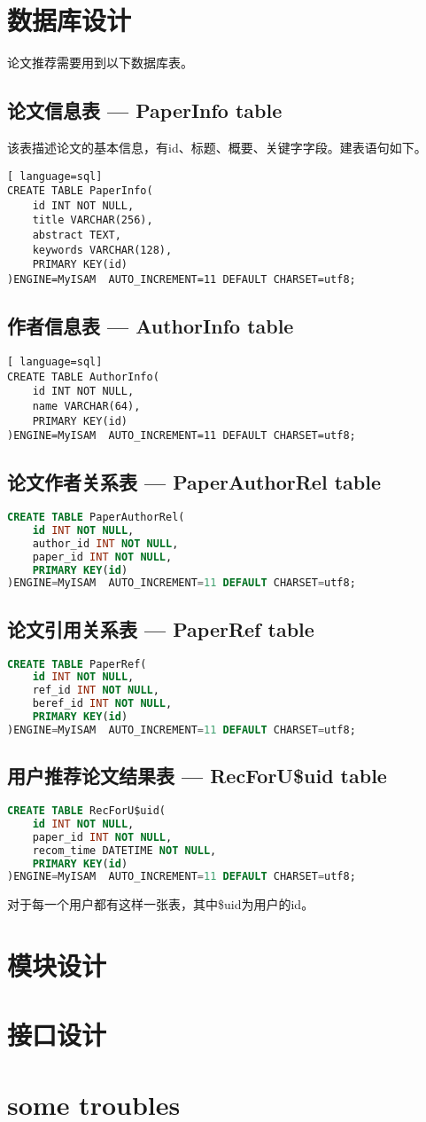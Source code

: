 \documentclass[a4paper]{article}
\begin{document}
\section{数据库设计}
论文推荐需要用到以下数据库表。
\subsection{论文信息表 --- PaperInfo table}
该表描述论文的基本信息，有id、标题、概要、关键字字段。建表语句如下。
\begin{lstlisting}[ language=sql]
CREATE TABLE PaperInfo(
    id INT NOT NULL,
    title VARCHAR(256),
    abstract TEXT,
    keywords VARCHAR(128),
    PRIMARY KEY(id)
)ENGINE=MyISAM  AUTO_INCREMENT=11 DEFAULT CHARSET=utf8;
\end{lstlisting}
\subsection{作者信息表 --- AuthorInfo table}
\begin{lstlisting}[ language=sql]
CREATE TABLE AuthorInfo(
    id INT NOT NULL,
    name VARCHAR(64),
    PRIMARY KEY(id)
)ENGINE=MyISAM  AUTO_INCREMENT=11 DEFAULT CHARSET=utf8;
\end{lstlisting}
\subsection{论文作者关系表 --- PaperAuthorRel table}
\begin{lstlisting}[language=sql]
CREATE TABLE PaperAuthorRel(
    id INT NOT NULL,
    author_id INT NOT NULL,
    paper_id INT NOT NULL,
    PRIMARY KEY(id)
)ENGINE=MyISAM  AUTO_INCREMENT=11 DEFAULT CHARSET=utf8;
\end{lstlisting}
\subsection{论文引用关系表 --- PaperRef table}
\begin{lstlisting}[language=sql]
CREATE TABLE PaperRef(
    id INT NOT NULL,
    ref_id INT NOT NULL,
    beref_id INT NOT NULL,
    PRIMARY KEY(id)
)ENGINE=MyISAM  AUTO_INCREMENT=11 DEFAULT CHARSET=utf8;
\end{lstlisting}
\subsection{用户推荐论文结果表 --- RecForU\$uid table}
\begin{lstlisting}[language=sql]
CREATE TABLE RecForU$uid(
    id INT NOT NULL,
    paper_id INT NOT NULL,
    recom_time DATETIME NOT NULL,
    PRIMARY KEY(id)
)ENGINE=MyISAM  AUTO_INCREMENT=11 DEFAULT CHARSET=utf8;
\end{lstlisting}
对于每一个用户都有这样一张表，其中\$uid为用户的id。
\section{模块设计}
\section{接口设计}
\section{some troubles}
\end{document}
